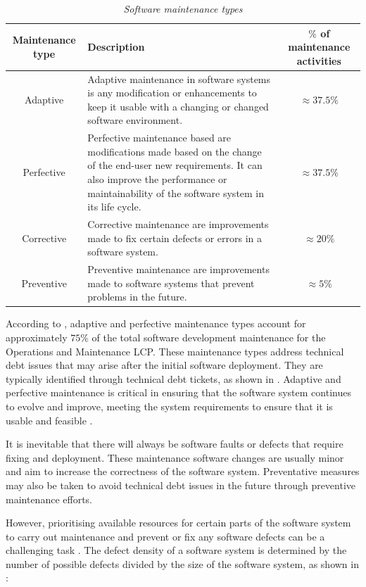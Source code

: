 \begin{table}[!htb]
	\centering
	\caption[Software maintenance types]
	{\textit{Software maintenance types \cite{Ping2010,Hasan2012}}}
	\label{tbl:ch1_maintenanceTypes}
	\begin{tabularx}{\textwidth}{|c|X|c|}
		\hline
		\textbf{Maintenance type} & \textbf{Description} & \textbf{$\%$ of maintenance activities} \\ \hline
		Adaptive & \raggedright Adaptive maintenance in software systems is any modification or enhancements to keep it usable with a changing or changed software environment. & $\approx 37.5\%$ \\ \hline
		Perfective & \raggedright Perfective maintenance based are modifications made based on the change of the end-user new requirements. It can also improve the performance or maintainability of the software system in its life cycle. & $\approx 37.5\%$ \\ \hline
		Corrective & \raggedright Corrective maintenance are improvements made to fix certain defects or errors in a software system. & $\approx 20\%$ \\ \hline
		Preventive & \raggedright  Preventive maintenance are improvements made to software systems that prevent problems in the future. & $\approx 5\%$ \\ \hline
	\end{tabularx}
\end{table}

According to , adaptive and perfective maintenance types account for approximately $75\%$ of the total software development maintenance for the Operations and Maintenance LCP. These maintenance types address technical debt issues that may arise after the initial software deployment. They are typically identified through technical debt tickets, as shown in . Adaptive and perfective maintenance is critical in ensuring that the software system continues to evolve and improve, meeting the system requirements to ensure that it is usable and feasible \cite{Kumar2013}.\par It is inevitable that there will always be software faults or defects that require fixing and deployment. These maintenance software changes are usually minor and aim to increase the correctness of the software system. Preventative measures may also be taken to avoid technical debt issues in the future through preventive maintenance efforts.\par However, prioritising available resources for certain parts of the software system to carry out maintenance and prevent or fix any software defects can be a challenging task \cite{Mamone1994, Hasan2012}. The defect density of a software system is determined by the number of possible defects divided by the size of the software system, as shown in :

